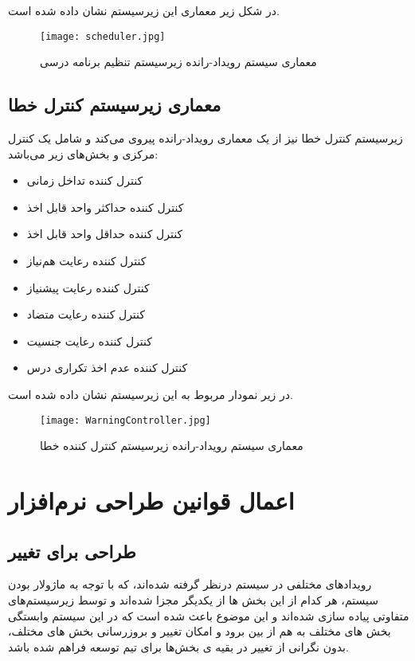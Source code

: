 \documentclass{report}
\begin{document}
در شکل زیر معماری این زیرسیستم نشان داده شده ‌است.

\begin{figure}[h!]
  \texttt{[image: scheduler.jpg]}
  \caption{معماری سیستم رویداد-رانده زیرسیستم تنظیم برنامه درسی}
  \label{fig:1}
\end{figure}

\subsection{معماری زیرسیستم کنترل خطا}
زیرسیستم کنترل خطا نیز از یک معماری رویداد-رانده پیروی می‌کند و شامل یک کنترل مرکزی و بخش‌های زیر می‌باشد:

\begin{itemize}
\item
 کنترل کننده تداخل زمانی

\item
کنترل کننده حداکثر واحد قابل اخذ

\item
کنترل کننده حداقل واحد قابل اخذ

\item
کنترل کننده رعایت هم‌نیاز

\item
کنترل کننده رعایت پیشنیاز

\item
کنترل کننده رعایت متضاد

\item
کنترل کننده رعایت جنسیت

\item
کنترل کننده عدم اخذ تکراری درس 
\end{itemize}

در زیر نمودار مربوط به این زیرسیستم نشان داده‌ شده‌ است.

\begin{figure}[h!]
  \texttt{[image: WarningController.jpg]}
  \caption{معماری سیستم رویداد-رانده زیرسیستم کنترل کننده خطا}
  \label{fig:1}
\end{figure}

\section{اعمال قوانین طراحی نرم‌افزار‬}
\subsection{طراحی برای تغییر}
رویدادهای مختلفی در سیستم درنظر گرفته شده‌اند، که با توجه به ماژولار بودن سیستم، هر کدام از این بخش ها از یکدیگر مجزا شده‌اند و توسط زیرسیستم‌های متفاوتی پیاده سازی شده‌اند و این موضوع باعث شده است که در این سیستم وابستگی بخش های مختلف به هم از بین برود و امکان تغییر و بروزرسانی بخش های مختلف، بدون نگرانی از تغییر در بقیه ی بخش‌ها برای تیم توسعه فراهم شده باشد.
\end{document}
